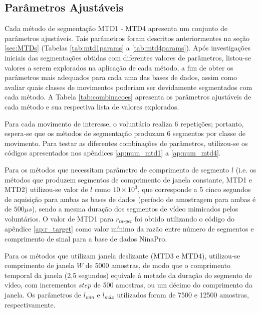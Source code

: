 				\subsection{Parâmetros Ajustáveis}
Cada método de segmentação MTD1 - MTD4 apresenta um conjunto de parâmetros ajustáveis. Tais parâmetros foram descritos anteriormentes na seção \ref{sec:MTDs} (Tabelas \ref{tab:mtd1params} a \ref{tab:mtd4params}). Após investigações iniciais das segmentações obtidas com diferentes valores de parâmetros, listou-se valores a serem explorados na aplicação de cada método, a fim de obter os parâmetros mais adequados para cada uma das bases de dados, assim como avaliar quais classes de movimentos poderiam ser devidamente segmentados com cada método. A Tabela \ref{tab:combinacoes} apresenta os parâmetros ajustáveis de cada método e sua respectiva lista de valores explorados.



Para cada movimento de interesse, o voluntário realiza 6 repetições; portanto, espera-se que os métodos de segmentação produzam 6 segmentos por classe de movimento. Para testar as diferentes combinações de parâmetros, utilizou-se os códigos apresentados nos apêndices \ref{ap:num_mtd1} a \ref{ap:num_mtd4}.

Para os métodos que necessitam parâmetro de comprimento de segmento $l$ (i.e. os métodos que produzem segmentos de comprimento de janela constante, MTD1 e MTD2) utilizou-se valor de $l$ como $10 \times 10^3$, que corresponde a 5 cinco segundos de aquisição para ambas as bases de dados (período de amostragem para ambas é de $500 \mu s$), sendo a mesma duração dos segmentos de vídeo mimicados pelos voluntários. O valor de MTD1 para $r_{target}$ foi obtido utilizando o código do apêndice \ref{ap:r_target} como valor mínimo da razão entre número de segmentos e comprimento de sinal para a base de dados NinaPro.

Para os métodos que utilizam janela deslizante (MTD3 e MTD4), utilizou-se comprimento de janela $W$ de 5000 amostras, de modo que o comprimento temporal da janela (2,5 segundos) equivale à metade da duração do segmento de vídeo, com incrementos $step$ de 500 amostras, ou um décimo do comprimento da janela. Os parâmetros de $l_{mín}$ e $l_{máx}$ utilizados foram de 7500 e 12500 amostras, respectivamente.

